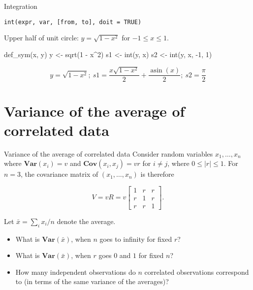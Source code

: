 \documentclass[
  ignorenonframetext,
]{beamer}
\newenvironment{Shaded}{\begin{snugshade}}{\end{snugshade}}
\newcommand{\DecValTok}[1]{\textcolor[rgb]{0.68,0.00,0.00}{#1}}
\newcommand{\FunctionTok}[1]{\textcolor[rgb]{0.28,0.35,0.67}{#1}}
\newcommand{\NormalTok}[1]{\textcolor[rgb]{0.00,0.23,0.31}{#1}}
\newcommand{\OtherTok}[1]{\textcolor[rgb]{0.00,0.23,0.31}{#1}}
\newcommand{\SpecialCharTok}[1]{\textcolor[rgb]{0.37,0.37,0.37}{#1}}
\begin{document}
\begin{frame}[fragile]{Integration}
\protect\hypertarget{integration}{}
\begin{verbatim}
int(expr, var, [from, to], doit = TRUE)
\end{verbatim}

Upper half of unit circle: \(y=\sqrt{1-x^2}\) for \(-1 \le x \le 1\).

\begin{Shaded}
\begin{Highlighting}[]
\FunctionTok{def\_sym}\NormalTok{(x, y)}
\NormalTok{y }\OtherTok{\textless{}{-}} \FunctionTok{sqrt}\NormalTok{(}\DecValTok{1} \SpecialCharTok{{-}}\NormalTok{ x}\SpecialCharTok{\^{}}\DecValTok{2}\NormalTok{)}
\NormalTok{s1 }\OtherTok{\textless{}{-}} \FunctionTok{int}\NormalTok{(y, x)}
\NormalTok{s2 }\OtherTok{\textless{}{-}} \FunctionTok{int}\NormalTok{(y, x, }\SpecialCharTok{{-}}\DecValTok{1}\NormalTok{, }\DecValTok{1}\NormalTok{)}
\end{Highlighting}
\end{Shaded}

\[
y=\sqrt{1 - x^{2}}; \: s1 = \frac{x \sqrt{1 - x^{2}}}{2} + \frac{\operatorname{asin}{\left(x \right)}}{2}; \: s2=\frac{\pi}{2}
\]
\end{frame}

\hypertarget{variance-of-the-average-of-correlated-data}{%
\section{Variance of the average of correlated
data}\label{variance-of-the-average-of-correlated-data}}

\begin{frame}{Variance of the average of correlated data}
Consider random variables \(x_1,\dots, x_n\) where
\(\mathbf{Var}(x_i)=v\) and \(\mathbf{Cov}(x_i, x_j)=v r\) for
\(i\not = j\), where \(0 \le |r| \le1\). For \(n=3\), the covariance
matrix of \((x_1,\dots, x_n)\) is therefore

\begin{equation}
  \label{eq:1}
  V = v R = v \left[\begin{matrix}1 & r & r\\r & 1 & r\\r & r & 1\end{matrix}\right].
\end{equation}

Let \(\bar x = \sum_i x_i / n\) denote the average.

\begin{itemize}
\item
  What is \(\mathbf{Var}(\bar x)\), when \(n\) goes to infinity for
  fixed \(r\)?
\item
  What is \(\mathbf{Var}(\bar x)\), when \(r\) goes \(0\) and \(1\) for
  fixed \(n\)?
\item
  How many independent observations do \(n\) correlated observations
  correspond to (in terms of the same variance of the averages)?
\end{itemize}
\end{frame}
\end{document}
